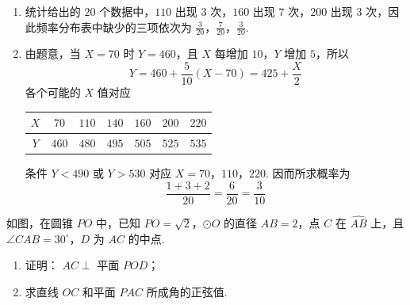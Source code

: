 \begin{solution}
\begin{enumerate}
\item
统计给出的 \(20\) 个数据中，\(110\) 出现 \(3\) 次，\(160\) 出现 \(7\) 次，\(200\) 出现 \(3\) 次，因此频率分布表中缺少的三项依次为
\(\frac{3}{20}\)，\(\frac{7}{20}\)，\(\frac{3}{20}\).

\item
由题意，当 \(X=70\) 时 \(Y=460\)，且 \(X\) 每增加 \(10\)，\(Y\) 增加 \(5\)，所以
\[
Y=460+\frac{5}{10}(X-70)=425+\frac{X}{2}
\]
各个可能的 \(X\) 值对应
\begin{center}
\begin{tabular}{c|cccccc}
\(X\) & \(70\) & \(110\) & \(140\) & \(160\) & \(200\) & \(220\) \\
\hline
\(Y\) & \(460\) & \(480\) & \(495\) & \(505\) & \(525\) & \(535\)
\end{tabular}
\end{center}
条件 \(Y<490\) 或 \(Y>530\) 对应 \(X=70\)，\(110\)，\(220\). 因而所求概率为
\[
\frac{1+3+2}{20}=\frac{6}{20}=\frac{3}{10}
\]
\end{enumerate}
\end{solution}

\begin{problem}
如图，在圆锥 \(PO\) 中，已知 \(PO = \sqrt{2}\)，\(\odot O\) 的直径 \(AB = 2\)，点 \(C\) 在 \(\widehat{AB}\) 上，且 \(\angle CAB = 30^{\circ}\)，\(D\) 为 \(AC\) 的中点.

\begin{enumerate}
\item 证明： \(AC \perp\) 平面 \(POD\)；
\item 求直线 \(OC\) 和平面 \(PAC\) 所成角的正弦值.
\end{enumerate}

\end{problem}

